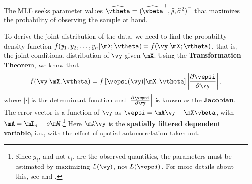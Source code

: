 \documentclass[english,12pt]{book}\usepackage[]{graphicx}\usepackage[]{xcolor}
\begin{document}
The MLE seeks parameter values $\widehat{\vtheta} = (\widehat{\vbeta}^\top, \widehat{\rho}, \widehat{\sigma}^2)^\top$ that maximizes the probability of observing the sample at hand. 

% 

To derive the joint distribution of the data, we need to find the probability density function $f(y_1, y_2,\ldots,y_n| \mX; \vtheta) = f(\vy|\mX;\vtheta)$, that is, the joint conditional distribution of $\vy$ given $\mX$. Using the \textbf{Transformation Theorem}, we know that
\begin{equation*}
  f(\vy | \mX; \vtheta) = f\left[\vepsi(\vy)| \mX; \vtheta\right] \left|\frac{\partial \vepsi}{\partial \vy}\right|.
\end{equation*}
%
where $\left|\cdot\right|$ is the determinant function and $\left|\frac{\partial \vepsi}{\partial \vy}\right|$ is known as the \textbf{Jacobian}. The error vector is a function of $\vy$ as $\vepsi = \mA\vy - \mX\vbeta$, with $\mA=\mI_n - \rho\mW$.\footnote{Since $y_i$, and not $\epsilon_i$, are the observed quantities, the parameters must be estimated by maximizing $L(\vy)$, not $L(\vepsi)$. For more details about this, see \cite{mead1967mathematical} and \cite{doreian1981estimating}.} Here $\mA\vy$ is the \textbf{spatially filtered dependent variable}, i.e., with the effect of spatial autocorrelation taken out. 
\end{document}

